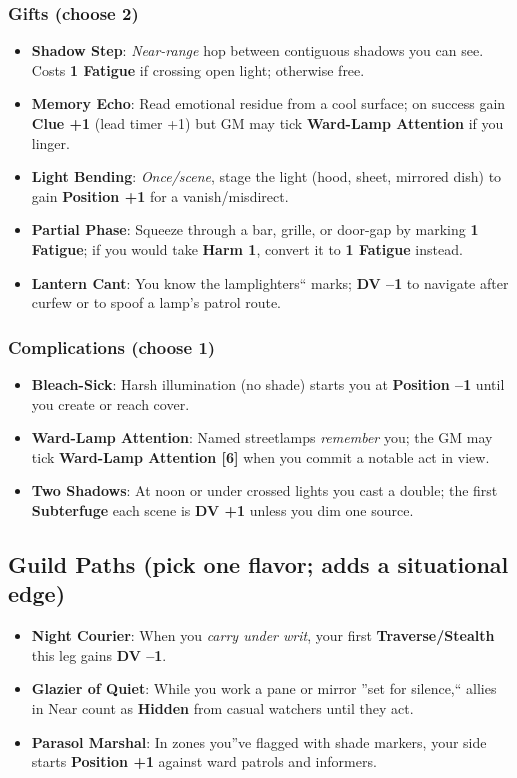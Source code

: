 \documentclass[11pt]{book}
\begin{document}
\subsubsection*{Gifts (choose 2)}
\begin{itemize}
    \item \textbf{Shadow Step}: \emph{Near-range} hop between contiguous shadows you can see. Costs \textbf{1 Fatigue} if crossing open light; otherwise free.
    \item \textbf{Memory Echo}: Read emotional residue from a cool surface; on success gain \textbf{Clue +1} (lead timer +1) but GM may tick \textbf{Ward-Lamp Attention} if you linger.
    \item \textbf{Light Bending}: \emph{Once/scene}, stage the light (hood, sheet, mirrored dish) to gain \textbf{Position +1} for a vanish/misdirect.
    \item \textbf{Partial Phase}: Squeeze through a bar, grille, or door-gap by marking \textbf{1 Fatigue}; if you would take \textbf{Harm 1}, convert it to \textbf{1 Fatigue} instead.
    \item \textbf{Lantern Cant}: You know the lamplighters`` marks; \textbf{DV --1} to navigate after curfew or to spoof a lamp's patrol route.
\end{itemize}

\subsubsection*{Complications (choose 1)}
\begin{itemize}
    \item \textbf{Bleach-Sick}: Harsh illumination (no shade) starts you at \textbf{Position --1} until you create or reach cover.
    \item \textbf{Ward-Lamp Attention}: Named streetlamps \emph{remember} you; the GM may tick \textbf{Ward-Lamp Attention [6]} when you commit a notable act in view.
    \item \textbf{Two Shadows}: At noon or under crossed lights you cast a double; the first \textbf{Subterfuge} each scene is \textbf{DV +1} unless you dim one source.
\end{itemize}

\subsection*{Guild Paths (pick one flavor; adds a situational edge)}
\begin{itemize}
    \item \textbf{Night Courier}: When you \emph{carry under writ}, your first \textbf{Traverse/Stealth} this leg gains \textbf{DV --1}.
    \item \textbf{Glazier of Quiet}: While you work a pane or mirror ''set for silence,`` allies in Near count as \textbf{Hidden} from casual watchers until they act.
    \item \textbf{Parasol Marshal}: In zones you''ve flagged with shade markers, your side starts \textbf{Position +1} against ward patrols and informers.
\end{itemize}
\end{document}
